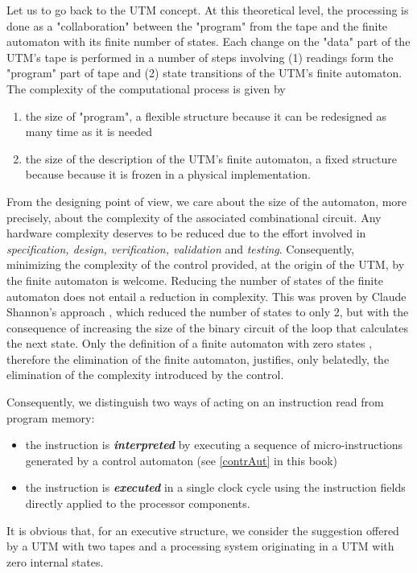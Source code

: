 Let us to go back to the UTM concept. At this theoretical level, the processing is done as a "collaboration" between the "program" from the tape and the finite automaton with its finite number of states. Each change on the "data" part of the UTM's tape is performed in a number of steps involving (1) readings form the "program" part of tape and (2) state transitions of the UTM's finite automaton. The complexity of the computational process is given by
\begin{enumerate}
    \item the size of "program", a flexible structure because it can be redesigned as many time as it is needed
    \item the size of the description of the UTM's finite automaton, a fixed structure because because it is frozen in a physical implementation.
\end{enumerate}
From the designing point of view, we care about the size of the automaton, more precisely, about the complexity of the associated combinational circuit. Any hardware complexity deserves to be reduced due to the effort involved in {\em specification, design, verification, validation} and {\em testing}. Consequently, minimizing the complexity of the control provided, at the origin of the UTM, by the finite automaton is welcome. Reducing the number of states of the finite automaton does not entail a reduction in complexity. This was proven by Claude Shannon's approach \cite{Shannon56}, which reduced the number of states to only 2, but with the consequence of increasing the size of the binary circuit of the loop that calculates the next state. Only the definition of a finite automaton with zero states \cite{Stefan06Turing}, therefore the elimination of the finite automaton, justifies, only belatedly, the elimination of the complexity introduced by the control.

Consequently, we distinguish two ways of acting on an instruction read from program memory:
\begin{itemize}
    \item the instruction is {\bf {\em interpreted}} by executing a sequence of micro-instructions generated by a control automaton (see \ref{contrAut} in this book)
    \item the instruction is {\bf {\em executed}} in a single clock cycle using the instruction fields directly applied to the processor components. 
\end{itemize}
It is obvious that, for an executive structure, we consider the suggestion offered by a UTM with two tapes and a processing system originating in a UTM with zero internal states.


